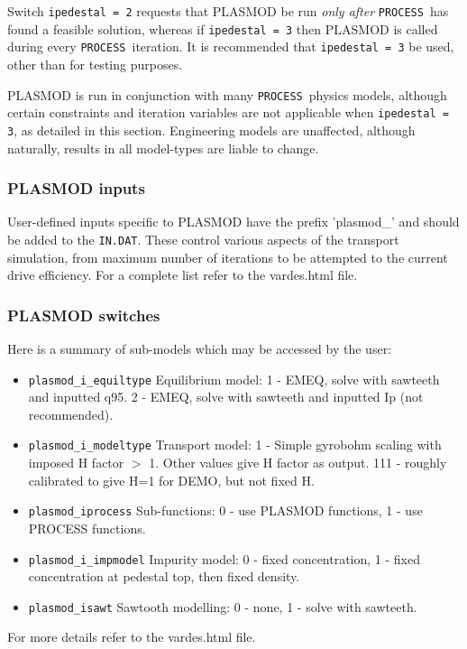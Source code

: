 \documentclass[11pt,a4paper]{report}
\newcommand{\indat}{\mbox{\texttt{IN.DAT}}}
\newcommand{\process}{\mbox{\texttt{PROCESS}}}
\begin{document}
Switch \texttt{ipedestal = 2} requests that PLASMOD be run \textit{only after} \process\ has found a feasible solution, whereas if \texttt{ipedestal = 3} then PLASMOD is called during every \process\ iteration. It is recommended that \texttt{ipedestal = 3} be used, other than for testing purposes.

PLASMOD is run in conjunction with many \process\ physics models, although certain constraints and iteration variables are not applicable when \texttt{ipedestal = 3}, as detailed in this section. Engineering models are unaffected, although naturally, results in all model-types are liable to change.

\subsubsection*{PLASMOD inputs}
User-defined inputs specific to PLASMOD have the prefix 'plasmod\_' and should be added to the \indat. These control various aspects of the transport simulation, from maximum number of iterations to be attempted to the current drive efficiency. For a complete list refer to the vardes.html file.

\subsubsection*{PLASMOD switches}
Here is a summary of sub-models which may be accessed by the user:

\begin{itemize}
\item \texttt{plasmod\_i\_equiltype} Equilibrium model: 1 - EMEQ, solve with sawteeth and inputted q95. 2 - EMEQ, solve with sawteeth and inputted Ip (not recommended).
\item \texttt{plasmod\_i\_modeltype} Transport model: 1 - Simple gyrobohm scaling with imposed H factor $>$ 1. Other values give H factor as output. 111 - roughly calibrated to give H=1 for DEMO, but not fixed H.
\item \texttt{plasmod\_iprocess} Sub-functions: 0 - use PLASMOD functions, 1 - use PROCESS functions.
\item \texttt{plasmod\_i\_impmodel} Impurity model: 0 - fixed concentration, 1 - fixed concentration at pedestal top, then fixed density. 
\item \texttt{plasmod\_isawt} Sawtooth modelling: 0 - none, 1 - solve with sawteeth.  
\end{itemize}

For more details refer to the vardes.html file.
\end{document}
